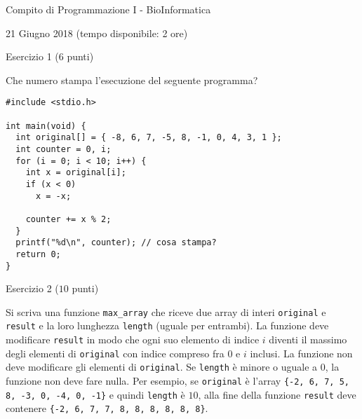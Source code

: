 \documentclass[12pt]{article}
\begin{document}
\begin{center}{\LARGE Compito di Programmazione I - BioInformatica}\\
\vspace*{-2ex}
\begin{center}
  \large 21 Giugno 2018 (tempo disponibile: 2 ore)
\end{center}
\end{center}

\begin{center}{\Large Esercizio 1} ($6$ punti)
\end{center}
Che numero stampa l'esecuzione del seguente programma?
\begin{lstlisting}
#include <stdio.h>

int main(void) {
  int original[] = { -8, 6, 7, -5, 8, -1, 0, 4, 3, 1 };
  int counter = 0, i;
  for (i = 0; i < 10; i++) {
    int x = original[i];
    if (x < 0)
      x = -x;

    counter += x % 2;
  }
  printf("%d\n", counter); // cosa stampa?
  return 0;
}
\end{lstlisting}

\vspace*{1ex}
\begin{center}{\Large Esercizio 2} ($10$ punti)
\end{center}
Si scriva una funzione \texttt{max\_array} che riceve due array di interi \texttt{original} e \texttt{result} e la loro lunghezza \texttt{length} (uguale per entrambi). La funzione deve modificare \texttt{result} in modo che ogni suo elemento di indice $i$ diventi il massimo degli elementi di \texttt{original} con indice compreso fra $0$ e $i$ inclusi. La funzione non deve modificare gli elementi di \texttt{original}. Se \texttt{length} \`e minore o uguale a $0$, la funzione non deve fare nulla. Per esempio, se \texttt{original} \`e l'array
\texttt{\{-2, 6, 7, 5, 8, -3, 0, -4, 0, -1\}} e quindi \texttt{length} \`e $10$, alla fine della funzione \texttt{result} deve contenere \texttt{\{-2, 6, 7, 7, 8, 8, 8, 8, 8, 8\}}.
\end{document}
